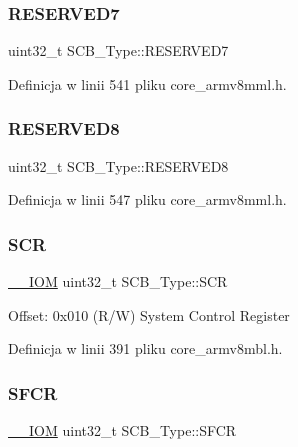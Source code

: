 \subsubsection{\texorpdfstring{R\+E\+S\+E\+R\+V\+E\+D7}{RESERVED7}}
{\footnotesize\ttfamily uint32\+\_\+t S\+C\+B\+\_\+\+Type\+::\+R\+E\+S\+E\+R\+V\+E\+D7}



Definicja w linii 541 pliku core\+\_\+armv8mml.\+h.

\mbox{\label{struct_s_c_b___type_a59625ca4782dad641d92f0294c705985}} 
\subsubsection{\texorpdfstring{R\+E\+S\+E\+R\+V\+E\+D8}{RESERVED8}}
{\footnotesize\ttfamily uint32\+\_\+t S\+C\+B\+\_\+\+Type\+::\+R\+E\+S\+E\+R\+V\+E\+D8}



Definicja w linii 547 pliku core\+\_\+armv8mml.\+h.

\mbox{\label{struct_s_c_b___type_a3a4840c6fa4d1ee75544f4032c88ec34}} 
\subsubsection{\texorpdfstring{S\+CR}{SCR}}
{\footnotesize\ttfamily \hyperlink{core__sc300_8h_ab6caba5853a60a17e8e04499b52bf691}{\+\_\+\+\_\+\+I\+OM} uint32\+\_\+t S\+C\+B\+\_\+\+Type\+::\+S\+CR}

Offset\+: 0x010 (R/W) System Control Register 

Definicja w linii 391 pliku core\+\_\+armv8mbl.\+h.

\mbox{\label{struct_s_c_b___type_a82273352d2e8c7a28a7b7cbdfc3d6a75}} 
\subsubsection{\texorpdfstring{S\+F\+CR}{SFCR}}
{\footnotesize\ttfamily \hyperlink{core__sc300_8h_ab6caba5853a60a17e8e04499b52bf691}{\+\_\+\+\_\+\+I\+OM} uint32\+\_\+t S\+C\+B\+\_\+\+Type\+::\+S\+F\+CR}

